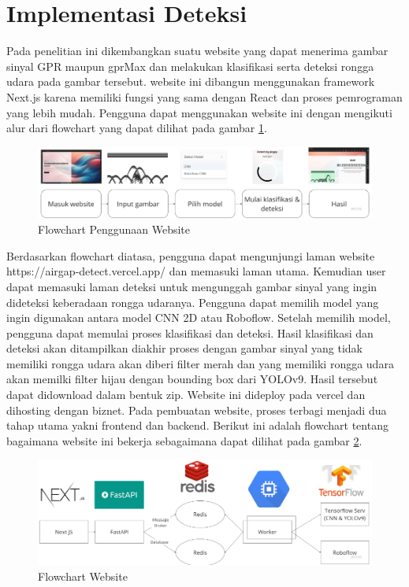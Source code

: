 \section{Implementasi Deteksi}
\label{sec:implementasi alat}
Pada penelitian ini dikembangkan suatu website yang dapat menerima gambar sinyal GPR maupun gprMax dan melakukan klasifikasi serta deteksi rongga udara pada gambar tersebut. website ini dibangun menggunakan framework Next.js karena memiliki fungsi yang sama dengan React dan proses pemrograman yang lebih mudah. Pengguna dapat menggunakan website ini dengan mengikuti alur dari flowchart yang dapat dilihat pada gambar \ref{fig:flowuser}.

\begin{minipage}{\linewidth}
  \begin{figure} [H] \centering
    \includegraphics[scale=0.1]{gambar/bab3/flowuser.png}
    \caption{Flowchart Penggunaan Website}
    \label{fig:flowuser}
  \end{figure}
\end{minipage}

Berdasarkan flowchart diatasa, pengguna dapat mengunjungi laman website https://airgap-detect.vercel.app/ dan memasuki laman utama. Kemudian user dapat memasuki laman deteksi untuk mengunggah gambar sinyal yang ingin dideteksi keberadaan rongga udaranya. Pengguna dapat memilih model yang ingin digunakan antara model CNN 2D atau Roboflow. Setelah memilih model, pengguna dapat memulai proses klasifikasi dan deteksi. Hasil klasifikasi dan deteksi akan ditampilkan diakhir proses dengan gambar sinyal yang tidak memiliki rongga udara akan diberi filter merah dan yang memiliki rongga udara akan memilki filter hijau dengan bounding box dari YOLOv9. Hasil tersebut dapat didownload dalam bentuk zip. Website ini dideploy pada vercel dan dihosting dengan biznet. Pada pembuatan website, proses terbagi menjadi dua tahap utama yakni frontend dan backend. Berikut ini adalah flowchart tentang bagaimana website ini bekerja sebagaimana dapat dilihat pada gambar \ref{fig:webflow}.

\begin{minipage}{\linewidth}
  \begin{figure} [H] \centering
    \includegraphics[scale=0.15]{gambar/bab3/webflow.png}
    \caption{Flowchart Website}
    \label{fig:webflow}
  \end{figure}
\end{minipage}


